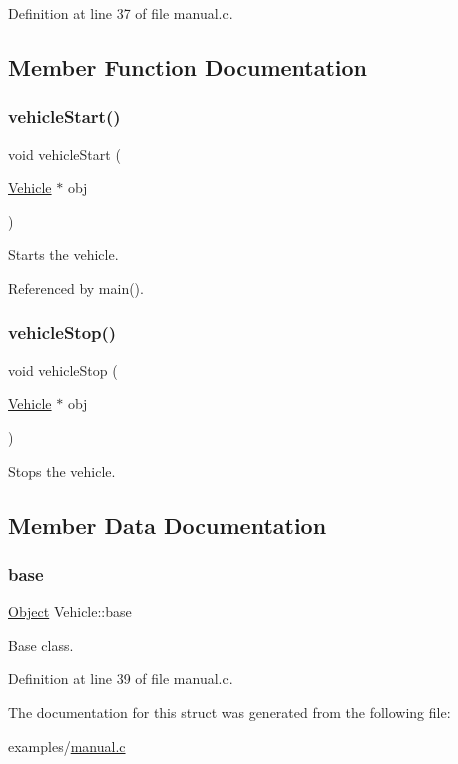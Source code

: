 Definition at line 37 of file manual.\+c.



\subsection{Member Function Documentation}
\mbox{\label{struct_vehicle_a6891d3d28853bc3fdd075596dc6de9f8}} 
\subsubsection{\texorpdfstring{vehicleStart()}{vehicleStart()}}
{\footnotesize\ttfamily void vehicle\+Start (\begin{DoxyParamCaption}\item[{\mbox{\hyperlink{struct_vehicle}{Vehicle}} $\ast$}]{obj }\end{DoxyParamCaption})}

Starts the vehicle. 

Referenced by main().

\mbox{\label{struct_vehicle_a4dcbcba43792dcd673a552b14479ab77}} 
\subsubsection{\texorpdfstring{vehicleStop()}{vehicleStop()}}
{\footnotesize\ttfamily void vehicle\+Stop (\begin{DoxyParamCaption}\item[{\mbox{\hyperlink{struct_vehicle}{Vehicle}} $\ast$}]{obj }\end{DoxyParamCaption})}

Stops the vehicle. 

\subsection{Member Data Documentation}
\mbox{\label{struct_vehicle_ad7970f528d429f6fc1725173e93a77c2}} 
\subsubsection{\texorpdfstring{base}{base}}
{\footnotesize\ttfamily \mbox{\hyperlink{struct_object}{Object}} Vehicle\+::base\hspace{0.3cm}{\ttfamily [protected]}}



Base class. 



Definition at line 39 of file manual.\+c.



The documentation for this struct was generated from the following file\+:\begin{DoxyCompactItemize}
\item 
examples/\mbox{\hyperlink{manual_8c}{manual.\+c}}\end{DoxyCompactItemize}
